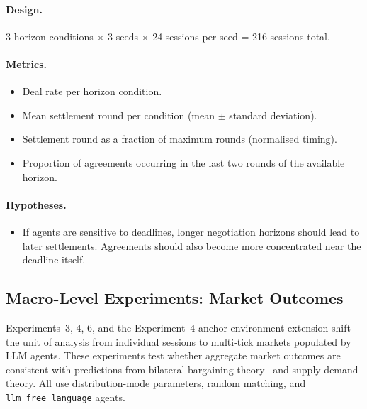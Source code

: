 \paragraph{Design.}
3 horizon conditions $\times$ 3 seeds $\times$ 24 sessions per seed = 216 sessions total.

\paragraph{Metrics.}
\begin{itemize}
    \item Deal rate per horizon condition.
    \item Mean settlement round per condition (mean $\pm$ standard deviation).
    \item Settlement round as a fraction of maximum rounds (normalised timing).
    \item Proportion of agreements occurring in the last two rounds of the available horizon.
\end{itemize}

\paragraph{Hypotheses.}
\begin{itemize}
    \item[\textbf{H-2a.}] If agents are sensitive to deadlines, longer negotiation horizons should lead to later settlements. Agreements should also become more concentrated near the deadline itself.
\end{itemize}


\subsection{Macro-Level Experiments: Market Outcomes}
\label{sec:exp-macro}

Experiments~3, 4, 6, and the Experiment~4 anchor-environment extension shift the unit of analysis from individual sessions to multi-tick markets populated by LLM agents.  These experiments test whether aggregate market outcomes are consistent with predictions from bilateral bargaining theory~\cite{rubinstein1985} and supply-demand theory.  All use distribution-mode parameters, random matching, and \texttt{llm\_free\_language} agents.

